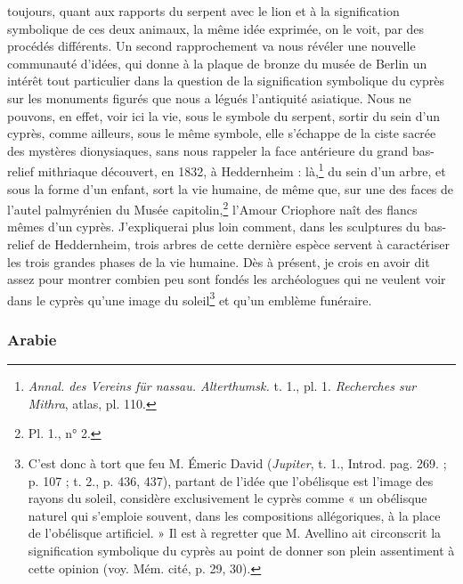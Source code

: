\documentclass{article}
\begin{document}
toujours, quant aux rapports du serpent avec le lion et à la signification symbolique de ces deux animaux, la même idée exprimée, on le voit, par des procédés différents. Un second rapprochement va nous révéler une nouvelle communauté d'idées, qui donne à la plaque de bronze du musée de Berlin un intérêt tout particulier dans la question de la signification symbolique du cyprès sur les monuments figurés que nous a légués l'antiquité asiatique. Nous ne pouvons, en effet, voir ici la vie, sous le symbole du serpent, sortir du sein d'un cyprès, comme ailleurs, sous le même symbole, elle s'échappe de la ciste sacrée des mystères dionysiaques, sans nous rappeler la face antérieure du grand bas-relief mithriaque découvert, en 1832, à Heddernheim : là,\footnote{\emph{Annal. des Vereins für nassau. Alterthumsk.} t. 1., pl. 1. \emph{Recherches sur Mithra}, atlas, pl. 110.} du sein d'un arbre, et sous la forme d'un enfant, sort la vie humaine, de même que, sur une des faces de l'autel palmyrénien du Musée capitolin,\footnote{Pl. 1., n° 2.} l'Amour Criophore naît des flancs mêmes d'un cyprès. J'expliquerai plus loin comment, dans les sculptures du bas-relief de Heddernheim, trois arbres de cette dernière espèce servent à caractériser les trois grandes phases de la vie humaine. Dès à présent, je crois en avoir dit assez pour montrer combien peu sont fondés les archéologues qui ne veulent voir dans le cyprès qu'une image du soleil\footnote{C'est donc à tort que feu M. Émeric David (\emph{Jupiter}, t. 1., Introd. pag. 269. ; p. 107 ; t. 2., p. 436, 437), partant de l'idée que l'obélisque est l'image des rayons du soleil, considère exclusivement le cyprès comme « un obélisque naturel qui s'emploie souvent, dans les compositions allégoriques, à la place de l'obélisque artificiel. » Il est à regretter que M. Avellino ait circonscrit la signification symbolique du cyprès au point de donner son plein assentiment à cette opinion (voy. Mém. cité, p. 29, 30).} et qu'un emblème funéraire.

\subsubsection{Arabie}
\end{document}
